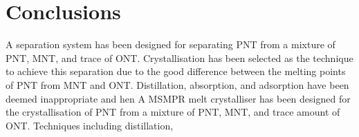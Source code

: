 \section{Conclusions}\label{separation conclusions}

A separation system has been designed for separating PNT from a mixture of PNT, MNT, and trace of ONT. Crystallisation has been selected as the technique to achieve this separation due to the good difference between the melting points of PNT from MNT and ONT. Distillation, absorption, and adsorption have been deemed inappropriate and hen A MSMPR melt crystalliser has been designed for the crystallisation of PNT from a mixture of PNT, MNT, and trace amount of ONT. Techniques including distillation, 